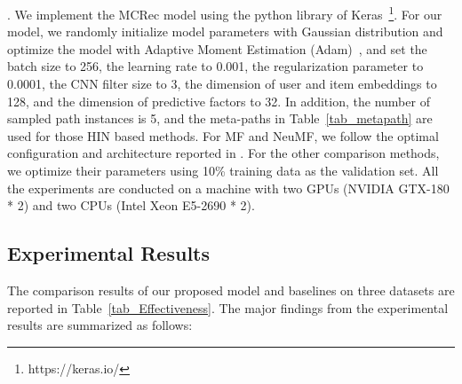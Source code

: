 .  We implement the MCRec model using the python library of Keras~\footnote{https://keras.io/}.
For our model, we randomly initialize model parameters with Gaussian distribution and optimize the model with Adaptive Moment Estimation (Adam)~\cite{kingma2014adam}, and set the batch size to 256, the learning rate to 0.001, the regularization parameter to 0.0001, the CNN filter size to  3, the dimension of user and item embeddings to 128, and the dimension of predictive factors to 32. In addition, the number of sampled path instances is 5, and the meta-paths in Table~\ref{tab_metapath} are used for those HIN based methods. 
For MF and NeuMF, we follow the optimal configuration and architecture reported in \cite{he2017neural}.
For the other comparison methods, we optimize their parameters using 10\% training data as the validation set. 
All the experiments are conducted on a machine with two GPUs (NVIDIA GTX-180 * 2) and two CPUs (Intel Xeon E5-2690 * 2).



\subsection{Experimental Results}
The comparison results of our proposed model and baselines on three datasets are reported in Table~\ref{tab_Effectiveness}. The major findings from the experimental results are summarized as follows:

